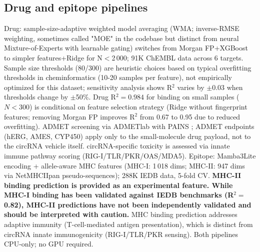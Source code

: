 \subsection*{Drug and epitope pipelines}
Drug: sample-size-adaptive weighted model averaging (WMA; inverse-RMSE weighting, sometimes called "MOE" in the codebase but distinct from neural Mixture-of-Experts with learnable gating) switches from Morgan FP+XGBoost to simpler features+Ridge for N$<$2\,000; 91K ChEMBL data across 6 targets. Sample size thresholds (80/300) are heuristic choices based on typical overfitting thresholds in cheminformatics (10-20 samples per feature), not empirically optimized for this dataset; sensitivity analysis shows R$^2$ varies by $\pm$0.03 when thresholds change by $\pm$50\%. Drug R$^2{=}0.984$ for binding on small samples ($N{<}300$) is conditional on feature selection strategy (Ridge without fingerprint features; removing Morgan FP improves R$^2$ from 0.67 to 0.95 due to reduced overfitting). ADMET screening via ADMETlab \citep{xiong2024} with PAINS \citep{baell2010}; ADMET endpoints (hERG, AMES, CYP450) apply only to the small-molecule drug payload, not to the circRNA vehicle itself. circRNA-specific toxicity is assessed via innate immune pathway scoring (RIG-I/TLR/PKR/OAS/MDA5). Epitope: Mamba3Lite \citep{gu2023} encoding + allele-aware MHC features (MHC-I: 1\,018 dims; MHC-II: 947 dims via NetMHCIIpan pseudo-sequences); 288K IEDB data, 5-fold CV. \textbf{MHC-II binding prediction is provided as an experimental feature. While MHC-I binding has been validated against IEDB benchmarks (R$^2{=}$0.82), MHC-II predictions have not been independently validated and should be interpreted with caution.} MHC binding prediction addresses adaptive immunity (T-cell-mediated antigen presentation), which is distinct from circRNA innate immunogenicity (RIG-I/TLR/PKR sensing). Both pipelines CPU-only; no GPU required.

